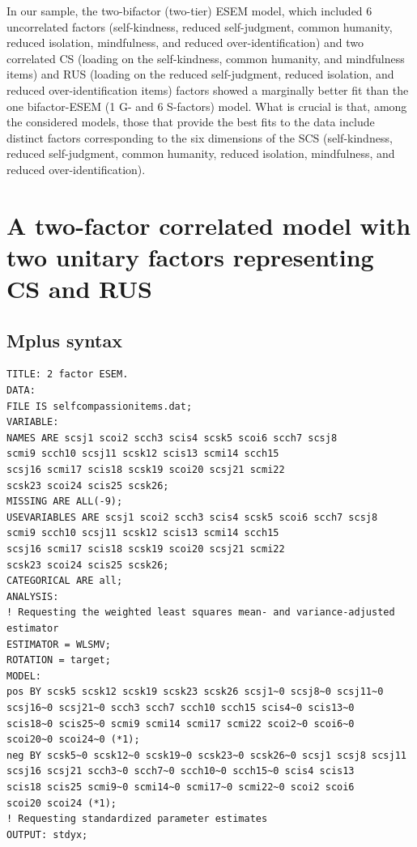 \documentclass[
  english,
  man,floatsintext]{apa7}
\begin{document}
\begin{appendix}
In our sample, the two-bifactor (two-tier) ESEM model, which included 6
uncorrelated factors (self-kindness, reduced self-judgment, common
humanity, reduced isolation, mindfulness, and reduced
over-identification) and two correlated CS (loading on the
self-kindness, common humanity, and mindfulness items) and RUS (loading
on the reduced self-judgment, reduced isolation, and reduced
over-identification items) factors showed a marginally better fit than
the one bifactor-ESEM (1 G- and 6 S-factors) model. What is crucial is
that, among the considered models, those that provide the best fits to
the data include distinct factors corresponding to the six dimensions of
the SCS (self-kindness, reduced self-judgment, common humanity, reduced
isolation, mindfulness, and reduced over-identification).

\newpage

\hypertarget{a-two-factor-correlated-model-with-two-unitary-factors-representing-cs-and-rus}{%
\section{A two-factor correlated model with two unitary factors
representing CS and
RUS}\label{a-two-factor-correlated-model-with-two-unitary-factors-representing-cs-and-rus}}

\hypertarget{mplus-syntax}{%
\subsection{Mplus syntax}\label{mplus-syntax}}

\begin{verbatim}
TITLE: 2 factor ESEM.
DATA:
FILE IS selfcompassionitems.dat;
VARIABLE:
NAMES ARE scsj1 scoi2 scch3 scis4 scsk5 scoi6 scch7 scsj8 
scmi9 scch10 scsj11 scsk12 scis13 scmi14 scch15 
scsj16 scmi17 scis18 scsk19 scoi20 scsj21 scmi22 
scsk23 scoi24 scis25 scsk26; 
MISSING ARE ALL(-9);
USEVARIABLES ARE scsj1 scoi2 scch3 scis4 scsk5 scoi6 scch7 scsj8 
scmi9 scch10 scsj11 scsk12 scis13 scmi14 scch15 
scsj16 scmi17 scis18 scsk19 scoi20 scsj21 scmi22 
scsk23 scoi24 scis25 scsk26; 
CATEGORICAL ARE all;
ANALYSIS:
! Requesting the weighted least squares mean- and variance-adjusted estimator
ESTIMATOR = WLSMV;
ROTATION = target;
MODEL:
pos BY scsk5 scsk12 scsk19 scsk23 scsk26 scsj1~0 scsj8~0 scsj11~0 
scsj16~0 scsj21~0 scch3 scch7 scch10 scch15 scis4~0 scis13~0 
scis18~0 scis25~0 scmi9 scmi14 scmi17 scmi22 scoi2~0 scoi6~0 
scoi20~0 scoi24~0 (*1);
neg BY scsk5~0 scsk12~0 scsk19~0 scsk23~0 scsk26~0 scsj1 scsj8 scsj11 
scsj16 scsj21 scch3~0 scch7~0 scch10~0 scch15~0 scis4 scis13 
scis18 scis25 scmi9~0 scmi14~0 scmi17~0 scmi22~0 scoi2 scoi6 
scoi20 scoi24 (*1);
! Requesting standardized parameter estimates
OUTPUT: stdyx;
\end{verbatim}


\end{appendix}
\end{document}
